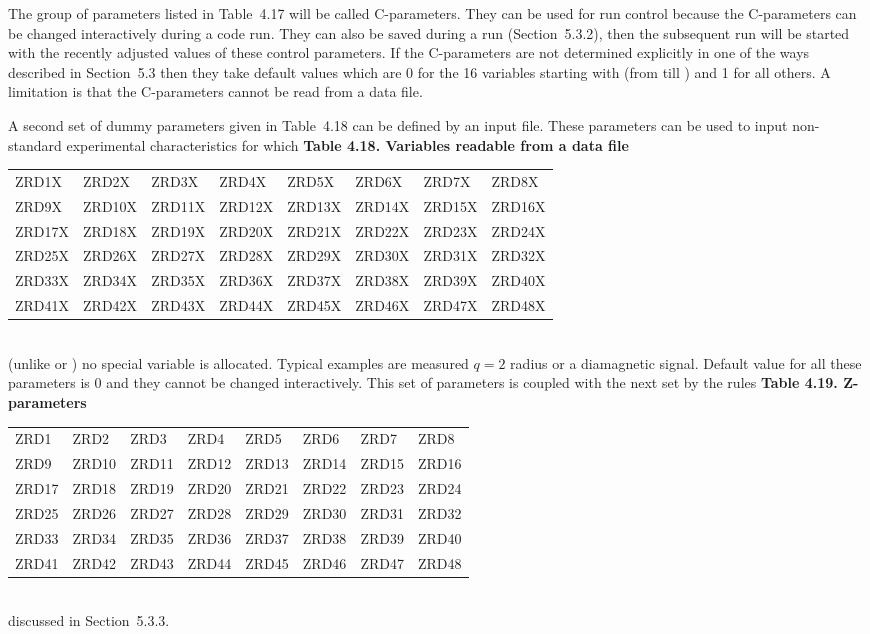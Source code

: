 The group of parameters listed in Table~4.17 will be called
C-parameters.
They can be used for run control because
the C-parameters can be changed interactively during a code run.  
They can also be saved during a run (Section~5.3.2), 
then the subsequent run will be started with the recently adjusted
values of these control parameters. 
If the C-parameters are not determined explicitly in one of the ways
described in Section~5.3 then they take default values which are 0 
for the 16 variables starting with  (from  till
) and 1 for all others. 
A limitation is that the C-parameters cannot be read from a data file. 

A second set of dummy parameters given in Table~4.18 can be defined by
an input file. 
These parameters can be used to input non-standard experimental
characteristics for which 
\linebreak\indent
{\bf Table 4.18. Variables readable from a data file}\\[2ex]
{\tt\begin{tabular}
{|p{15mm}p{15mm}p{15mm}p{15mm}p{15mm}p{15mm}p{15mm}p{15mm}|}      \hline
ZRD1X & ZRD2X & ZRD3X & ZRD4X & ZRD5X & ZRD6X & ZRD7X & ZRD8X \\
ZRD9X & ZRD10X& ZRD11X& ZRD12X& ZRD13X& ZRD14X& ZRD15X& ZRD16X\\ 
ZRD17X& ZRD18X& ZRD19X& ZRD20X& ZRD21X& ZRD22X& ZRD23X& ZRD24X\\
ZRD25X& ZRD26X& ZRD27X& ZRD28X& ZRD29X& ZRD30X& ZRD31X& ZRD32X\\  
ZRD33X& ZRD34X& ZRD35X& ZRD36X& ZRD37X& ZRD38X& ZRD39X& ZRD40X \\
ZRD41X& ZRD42X& ZRD43X& ZRD44X& ZRD45X& ZRD46X& ZRD47X& ZRD48X \\
\hline
\end{tabular}}\bigskip\\
(unlike  or ) no special variable is allocated. 
Typical examples are measured 
$q=2$ radius or a diamagnetic signal.
Default value for all these parameters is $0$ and they cannot be changed
interactively.
This set of parameters is coupled with the next set by the rules 
\linebreak\noindent
\indent
{\bf Table 4.19. Z-parameters}\\[2ex]
{\tt\begin{tabular}
{|p{15mm}p{15mm}p{15mm}p{15mm}p{15mm}p{15mm}p{15mm}p{15mm}|}	\hline
ZRD1	& ZRD2	& ZRD3	& ZRD4	& ZRD5	& ZRD6	& ZRD7	& ZRD8	\\
ZRD9	& ZRD10	& ZRD11	& ZRD12	& ZRD13	& ZRD14	& ZRD15	& ZRD16	\\ 
ZRD17	& ZRD18	& ZRD19	& ZRD20	& ZRD21	& ZRD22	& ZRD23	& ZRD24	\\
ZRD25	& ZRD26	& ZRD27	& ZRD28	& ZRD29	& ZRD30	& ZRD31	& ZRD32 \\ 
ZRD33 	& ZRD34 & ZRD35 & ZRD36 & ZRD37 & ZRD38 & ZRD39 & ZRD40 \\
ZRD41 	& ZRD42 & ZRD43 & ZRD44 & ZRD45 & ZRD46 & ZRD47 & ZRD48 \\ \hline
\end{tabular}}\bigskip\\
discussed in Section~5.3.3. 

